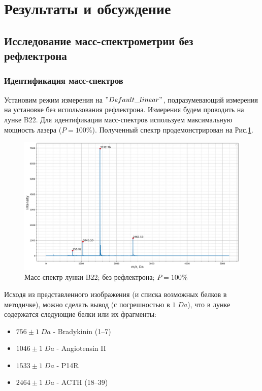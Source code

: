 \documentclass{article}
\begin{document}
\section{Результаты и обсуждение}
\subsection{Исследование масс-спектрометрии без рефлектрона}
\subsubsection{Идентификация масс-спектров}\;
\par Установим режим измерения на $"Default\_linear"$, подразумевающий измерения на установке без использования рефлектрона. Измерения будем проводить на лунке B22. Для идентификации масс-спектров используем максимальную мощность лазера ($P = 100 \%$). Полученный спектр продемонстрирован на Рис.\ref{Идентификация}.
\begin{figure}[h!]
\centering
    \includegraphics[width=\linewidth]{Images/linear_peaks.png}
    \caption{Масс-спектр лунки B22; без рефлектрона; $P = 100 \%$}
    \label{Идентификация}
\end{figure}

Исходя из представленного изображения (и списка возможных белков в методичке), можно сделать вывод (с погрешностью в $1\; Da$), что в лунке содержатся следующие белки или их фрагменты:
\begin{itemize}
    \item $756\pm1 \; Da$ - Bradykinin (1–7)
    \item $1046\pm1 \; Da$ - Angiotensin II
    \item $1533 \pm 1 \; Da$ - P14R
    \item $2464 \pm 1 \; Da$ - ACTH (18–39)
\end{itemize}
\end{document}
